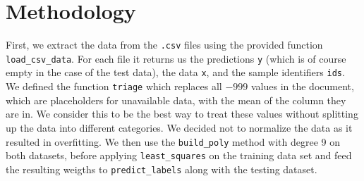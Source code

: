 \documentclass[10pt,conference,compsocconf]{IEEEtran}
\begin{document}
\section{Methodology}
First, we extract the data from the \texttt{.csv} files using the provided function \texttt{load\_csv\_data}. For each file it returns us the predictions \texttt{y} (which is of course empty in the case of the test data), the data \texttt{x}, and the sample identifiers \texttt{ids}. We defined the function \texttt{triage} which replaces all $-999$ values in the document, which are placeholders for unavailable data, with the mean of the column they are in. We consider this to be the best way to treat these values without splitting up the data into different categories. We decided not to normalize the data as it resulted in overfitting. We then use the \texttt{build\_poly} method with degree 9 on both datasets, before applying \texttt{least\_squares} on the training data set and feed the resulting weigths to \texttt{predict\_labels} along with the testing dataset.
\end{document}
